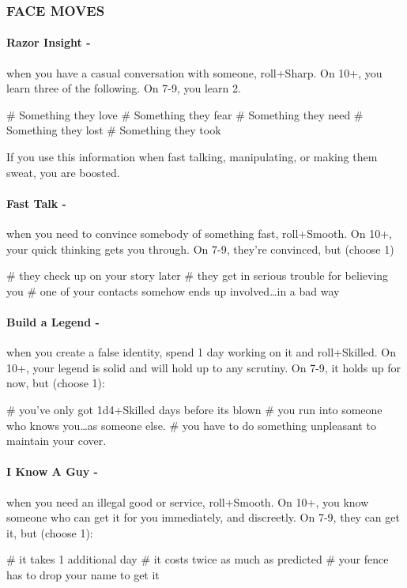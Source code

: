 \subsubsection{FACE MOVES}
\paragraph{Razor Insight -} when you have a casual conversation with someone, roll+Sharp. On 10+, you learn three of the following. On 7-9, you learn 2.
    \begin{easylist}
        # Something they love        
        # Something they fear        
        # Something they need        
        # Something they lost        
        # Something they took
    \end{easylist}
If you use this information when fast talking, manipulating, or making them sweat, you are boosted.

\paragraph{Fast Talk -} when you need to convince somebody of something fast, roll+Smooth. On 10+, your quick thinking gets you through. On 7-9, they’re convinced, but (choose 1)
    \begin{easylist}
        # they check up on your story later
        # they get in serious trouble for believing you
        # one of your contacts somehow ends up involved…in a bad way   
    \end{easylist}
        
\paragraph{Build a Legend -} when you create a false identity, spend 1 day working on it and roll+Skilled. On 10+, your legend is solid and will hold up to any scrutiny. On 7-9, it holds up for now, but (choose 1):
    \begin{easylist}
        # you've only got 1d4+Skilled days before its blown
        # you run into someone who knows you…as someone else.
        # you have to do something unpleasant to maintain your cover.
    \end{easylist}

\paragraph{I Know A Guy -} when you need an illegal good or service, roll+Smooth. On 10+, you know someone who can get it for you immediately, and discreetly. On 7-9, they can get it, but (choose 1):
    \begin{easylist}
        # it takes 1 additional day
        # it costs twice as much as predicted
        # your fence has to drop your name to get it
    \end{easylist}

